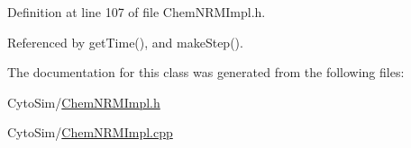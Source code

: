 Definition at line 107 of file Chem\-N\-R\-M\-Impl.\-h.



Referenced by get\-Time(), and make\-Step().



The documentation for this class was generated from the following files\-:\begin{DoxyCompactItemize}
\item 
Cyto\-Sim/\hyperlink{ChemNRMImpl_8h}{Chem\-N\-R\-M\-Impl.\-h}\item 
Cyto\-Sim/\hyperlink{ChemNRMImpl_8cpp}{Chem\-N\-R\-M\-Impl.\-cpp}\end{DoxyCompactItemize}
